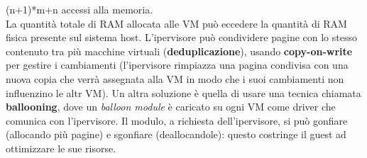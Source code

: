 \documentclass[12pt]{article}
\begin{document}
(n+1)*m+n accessi alla memoria.\\
La quantità totale di RAM allocata alle VM può eccedere la quantità di RAM fisica presente sul sistema host.
L'ipervisore può condividere pagine con lo stesso contenuto tra più macchine virtuali (\textbf{deduplicazione}), usando
\textbf{copy-on-write} per gestire i cambiamenti (l'ipervisore rimpiazza una pagina condivisa con una nuova copia che 
verrà assegnata alla VM in modo che i suoi cambiamenti non influenzino le altr VM).
Un altra soluzione è quella di usare una tecnica chiamata \textbf{ballooning}, dove un \textit{balloon module} è caricato
su ogni VM come driver che comunica con l'ipervisore. Il modulo, a richiesta dell'ipervisore, si può gonfiare (allocando
più pagine) e sgonfiare (deallocandole): questo costringe il guest ad ottimizzare le sue risorse.
\end{document}
